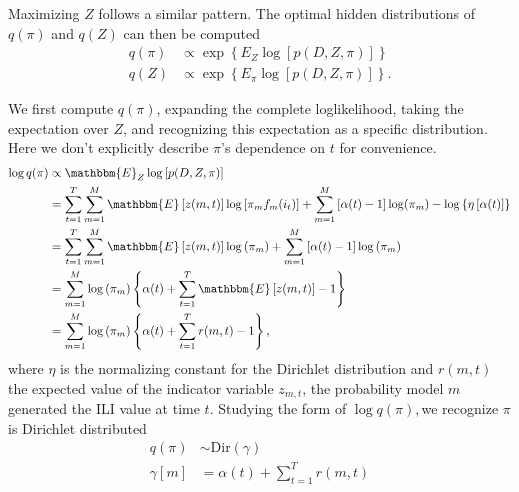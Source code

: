 \documentclass[12pt]{article}
\def\l{\left}
\def\r{\right}
\begin{document}
Maximizing $Z$ follows a similar pattern.
The optimal hidden distributions of $q(\pi)$ and $q(Z)$ can then be computed
\begin{align*}
  q(\pi) &\propto \exp\l\{E_{Z}\log\l[p(D,Z,\pi)\r]\r\}\\
  q(Z) &\propto \exp\l\{E_{\pi}\log\l[p(D,Z,\pi)\r]\r\}.
\end{align*}

We first compute $q(\pi)$, expanding the complete loglikelihood, taking the expectation over $Z$, and recognizing this expectation as a specific distribution.
Here we don't explicitly describe $\pi$'s dependence on $t$ for convenience.
\begin{align*}
  \log q(\pi) &\propto \mathbbm{E}_{Z} \log \l[ p(D,Z,\pi)\r]\\
              &= \sum_{t=1}^{T} \sum_{m=1}^{M}  \mathbbm{E} \l[z(m,t)\r] \log \l[ \pi_m f_{m}(i_{t}) \r] + \sum_{m=1}^{M} \l[\alpha(t)-1\r] \log(\pi_{m}) - \log \l\{\eta\l[\alpha(t)\r]\r\}\\
              &= \sum_{t=1}^{T} \sum_{m=1}^{M}  \mathbbm{E} \l[z(m,t)\r] \log \l( \pi_m \r) + \sum_{m=1}^{M} \l[\alpha(t)-1\r] \log\l(\pi_m\r)\\
              &= \sum_{m=1}^{M} \log \l( \pi_m \r)  \l\{ \alpha(t) + \sum_{t=1}^{T}  \mathbbm{E} \l[z(m,t)\r] - 1 \r\}\\
              &= \sum_{m=1}^{M} \log \l( \pi_m \r)  \l\{ \alpha(t) + \sum_{t=1}^{T}  r(m,t) - 1 \r\},
\end{align*}
where $\eta$ is the normalizing constant for the Dirichlet distribution and $r(m,t)$ the expected value of the indicator variable $z_{m,t}$, the probability model $m$ generated the ILI value at time $t$.
Studying the form of $\log q(\pi), $we recognize $\pi$ is Dirichlet distributed
\begin{align*}
  q(\pi) &\sim \mathrm{Dir}\l( \gamma \r)\\
  \gamma\l[m\r] &= \alpha(t) + \sum_{t=1}^{T}  r(m,t)
\end{align*}
\end{document}
